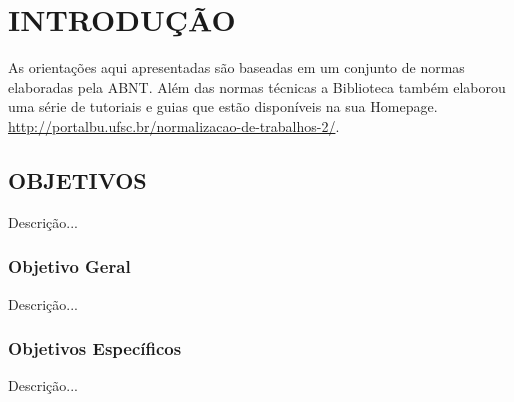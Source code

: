 
\chapter{INTRODUÇÃO}

As orientações aqui apresentadas
são baseadas em um conjunto de normas
elaboradas pela ABNT.
Além das normas técnicas a
Biblioteca também elaborou uma série de tutoriais
e guias que estão disponíveis na sua Homepage.
\url{http://portalbu.ufsc.br/normalizacao-de-trabalhos-2/}.

\section{OBJETIVOS}

Descrição...

\subsection{Objetivo Geral}

Descrição...

\subsection{Objetivos Específicos}

Descrição...
